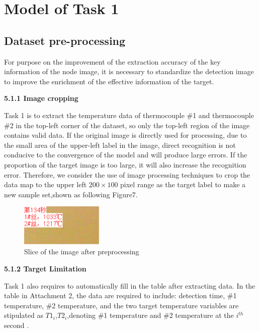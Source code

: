 \documentclass{apmcmthesis}
\begin{document}
\section{Model of Task 1 }

\subsection{Dataset pre-processing}
		
		For purpose on the improvement of the extraction accuracy of the key information of the node image, it is necessary to standardize the detection image to improve the enrichment of the effective information of the target.
		
		\noindent\textbf{5.1.1 Image cropping}
		
	 	Task 1 is to extract the temperature data of thermocouple \#1 and thermocouple  \#2 in the top-left corner of the dataset, so only the top-left region of the image contains valid data. If the original image is directly used for processing, due to the small area of the upper-left label in the image, direct recognition is not conducive to the convergence of the model and will produce large errors. If the proportion of the target image is too large, it will also increase the recognition error. Therefore, we consider the use of image processing techniques to crop the data map to the upper left $200\times100$ pixel range as the target label to make a new sample set,shown as following Figure7.
	 
		\begin{figure}
			\centering
			\includegraphics[height=2cm]{./figures/5-1.png}
			\caption{Slice of the image after preprocessing}
			\label{fig:8}
		\end{figure}
	
		\noindent\textbf{5.1.2 Target Limitation}
			
		Task 1 also requires to automatically fill in the table after extracting data. In the table in Attachment 2, the data are required to include: detection time, \#1 temperature, \#2 temperature, and the two target temperature variables are stipulated as $T1_{i}$,$T2_{i}$,denoting \#1 temperature   and \#2 temperature at the $i^{th}$second .
		
\end{document}
